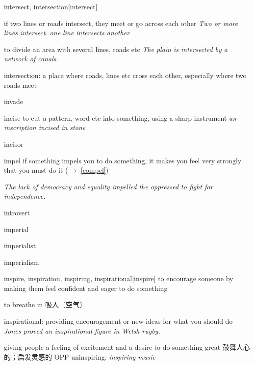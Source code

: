 \begin{DefWord}{intersect, intersection}[intersect]
    
    if two lines or roads intersect, they meet or go across each other
    \textit{Two or more lines intersect.}
    \textit{one line intersects another}

    to divide an area with several lines, roads etc
    \textit{The plain is intersected by a network of canals.}

    intersection: a place where roads, lines etc cross each other, especially where two roads meet
\end{DefWord}

\begin{DefWord}{invade}
\end{DefWord}


\begin{DefWord}{incise}
    to cut a pattern, word etc into something, using a sharp instrument
    \textit{an inscription incised in stone}
\end{DefWord}

\begin{DefWord}{incisor}
\end{DefWord}

\begin{DefWord}{impel}
    if something impels you to do something, it makes you feel very strongly that you must do it ($\rightarrow$ \ref{compel})

    \textit{The lack of democracy and equality impelled the oppressed to fight for independence.}
\end{DefWord}



\begin{DefWord}{introvert}
\end{DefWord}

\begin{DefWord}{imperial}
\end{DefWord}

\begin{DefWord}{imperialist}
\end{DefWord}

\begin{DefWord}{imperialism}
\end{DefWord}

\begin{DefWord}{inspire, inspiration, inspiring, inspirational}[inspire]
    to encourage someone by making them feel confident and eager to do something

    to breathe in 吸入〔空气〕

    inspirational: providing encouragement or new ideas for what you should do
    \textit{Jones proved an inspirational figure in Welsh rugby.}


    giving people a feeling of excitement and a desire to do something great 鼓舞人心的；启发灵感的 OPP  uninspiring:
    \textit{inspiring music}
\end{DefWord}

